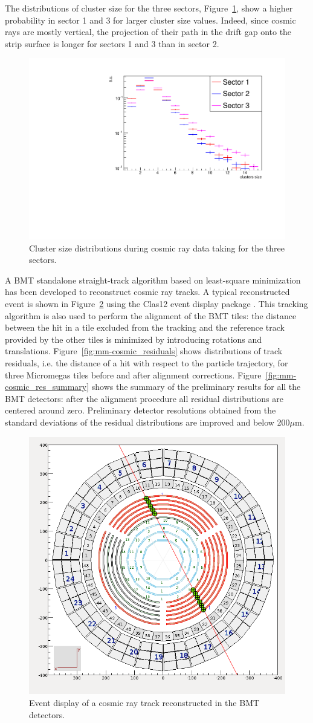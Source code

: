 The distributions of cluster size for the three sectors, Figure~\ref{fig:mm-cosmic_cls}, show a higher probability in sector 1 and 3 for larger cluster size values. Indeed, since cosmic rays are mostly vertical, the projection of their path in the drift gap onto the strip surface is longer for sectors 1 and 3 than in sector 2.

\begin{figure}[htb]
 \includegraphics[width=.45\textwidth]{images/cosmic_cluster_size.pdf}
 \caption{Cluster size distributions during cosmic ray data taking for the three sectors.}
 \label{fig:mm-cosmic_cls}
\end{figure}

A BMT standalone straight-track algorithm based on least-square minimization has been developed to reconstruct cosmic ray tracks. A typical reconstructed event is shown in Figure~\ref{fig:mm-cosmic_ced} using the Clas12 event display package \cite{nim:rec-ced}.
This tracking algorithm is also used to perform the alignment of the BMT tiles: the distance between the hit in a tile excluded from the tracking and the reference track provided by the other tiles is minimized by introducing rotations and translations. Figure~\ref{fig:mm-cosmic_residuals} shows distributions of track residuals, i.e. the distance of a hit with respect to the particle trajectory, for three Micromegas tiles before and after alignment corrections. Figure~\ref{fig:mm-cosmic_res_summary} shows the summary of the preliminary results for all the BMT detectors: after the alignment procedure all residual distributions are centered around zero. Preliminary detector resolutions obtained from the standard deviations of the residual distributions are improved and below 200$\mu$m. 

\begin{figure}[htb]
 \includegraphics[width=.4\textwidth]{images/cosmic_NIM.png}
 \caption{Event display of a cosmic ray track reconstructed in the BMT detectors.}
 \label{fig:mm-cosmic_ced}
\end{figure}

